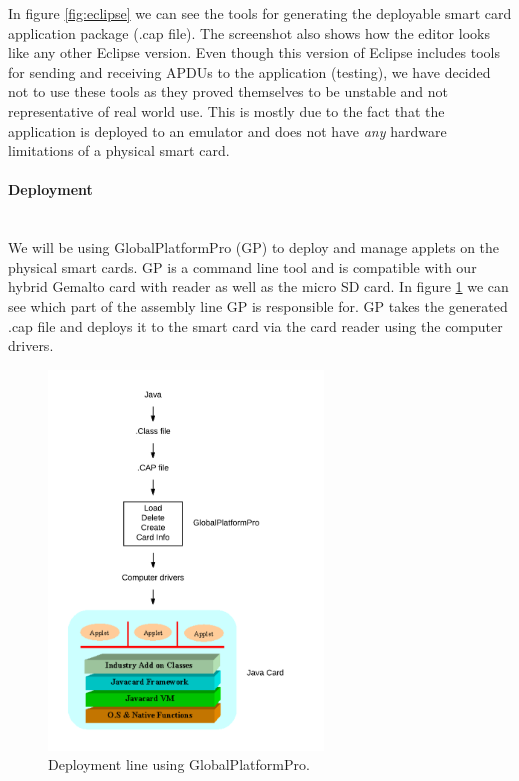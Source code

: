 In figure \ref{fig:eclipse} we can see the tools for generating the deployable smart card application package (.cap file). The screenshot also shows how the editor looks like any other Eclipse version. Even though this version of Eclipse includes tools for sending and receiving APDUs to the application (testing), we have decided not to use these tools as they proved themselves to be unstable and not representative of real world use. This is mostly due to the fact that the application is deployed to an emulator and does not have \textit{any} hardware limitations of a physical smart card.

\paragraph{Deployment}\mbox{}\\
We will be using GlobalPlatformPro (GP) \cite{globalplatform} to deploy and manage applets on the physical smart cards. GP is a command line tool and is compatible with our hybrid Gemalto card with reader as well as the micro SD card. In figure \ref{fig:deployFlow} we can see which part of the assembly line GP is responsible for. GP takes the generated .cap file and deploys it to the smart card via the card reader using the computer drivers.

\begin{figure}[h!]
  \caption{Deployment line using GlobalPlatformPro.}
  \label{fig:deployFlow}
  \centering
    \includegraphics[width=0.65\textwidth]{images/deployFlow.png}
\end{figure}


